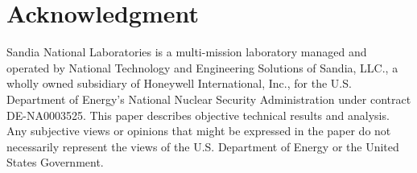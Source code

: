 \documentclass[11pt, letterpaper]{article}
\begin{document}
\section*{Acknowledgment}
Sandia National Laboratories is a multi-mission laboratory managed and operated by National Technology and Engineering Solutions of Sandia, LLC., a wholly owned subsidiary of Honeywell International, Inc., for the U.S. Department of Energy's National Nuclear Security Administration under contract DE-NA0003525.
This paper describes objective technical results and analysis.
Any subjective views or opinions that might be expressed in the paper do not necessarily represent the views of the U.S. Department of Energy or the United States Government.



\end{document}
